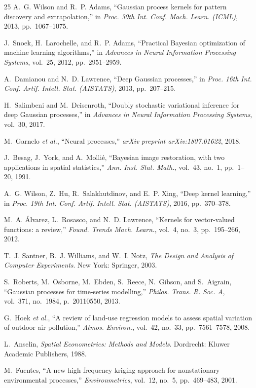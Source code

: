 \documentclass[conference]{IEEEtran}
\begin{document}
\begin{thebibliography}{25}
A.~G. Wilson and R.~P. Adams, ``Gaussian process kernels for pattern discovery and extrapolation,'' in \emph{Proc. 30th Int. Conf. Mach. Learn. (ICML)}, 2013, pp.~1067--1075.

J.~Snoek, H.~Larochelle, and R.~P. Adams, ``Practical Bayesian optimization of machine learning algorithms,'' in \emph{Advances in Neural Information Processing Systems}, vol.~25, 2012, pp.~2951--2959.

A.~Damianou and N.~D. Lawrence, ``Deep Gaussian processes,'' in \emph{Proc. 16th Int. Conf. Artif. Intell. Stat. (AISTATS)}, 2013, pp.~207--215.

H.~Salimbeni and M.~Deisenroth, ``Doubly stochastic variational inference for deep Gaussian processes,'' in \emph{Advances in Neural Information Processing Systems}, vol.~30, 2017.

M.~Garnelo \emph{et al.}, ``Neural processes,'' \emph{arXiv preprint arXiv:1807.01622}, 2018.

J.~Besag, J.~York, and A.~Molli\'{e}, ``Bayesian image restoration, with two applications in spatial statistics,'' \emph{Ann. Inst. Stat. Math.}, vol.~43, no.~1, pp.~1--20, 1991.

A.~G. Wilson, Z.~Hu, R.~Salakhutdinov, and E.~P. Xing, ``Deep kernel learning,'' in \emph{Proc. 19th Int. Conf. Artif. Intell. Stat. (AISTATS)}, 2016, pp.~370--378.

M.~A. \'{A}lvarez, L.~Rosasco, and N.~D. Lawrence, ``Kernels for vector-valued functions: a review,'' \emph{Found. Trends Mach. Learn.}, vol.~4, no.~3, pp.~195--266, 2012.

T.~J. Santner, B.~J. Williams, and W.~I. Notz, \emph{The Design and Analysis of Computer Experiments}. New York: Springer, 2003.

S.~Roberts, M.~Osborne, M.~Ebden, S.~Reece, N.~Gibson, and S.~Aigrain, ``Gaussian processes for time-series modelling,'' \emph{Philos. Trans. R. Soc. A}, vol.~371, no.~1984, p.~20110550, 2013.

G.~Hoek \emph{et al.}, ``A review of land-use regression models to assess spatial variation of outdoor air pollution,'' \emph{Atmos. Environ.}, vol.~42, no.~33, pp.~7561--7578, 2008.

L.~Anselin, \emph{Spatial Econometrics: Methods and Models}. Dordrecht: Kluwer Academic Publishers, 1988.

M.~Fuentes, ``A new high frequency kriging approach for nonstationary environmental processes,'' \emph{Environmetrics}, vol.~12, no.~5, pp.~469--483, 2001.

\end{thebibliography}
\end{document}
